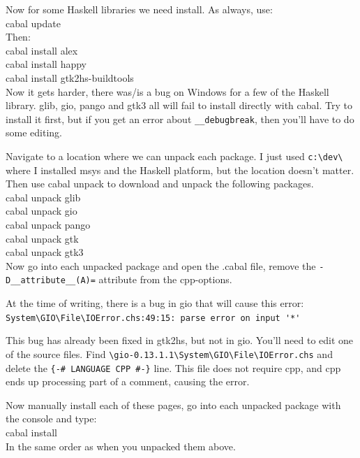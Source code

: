 \documentclass[10point]{article}
\begin{document}
\noindent Now for some Haskell libraries we need install. As always, use:\\
cabal update\\

\noindent Then:\\
cabal install alex\\
cabal install happy\\
cabal install gtk2hs-buildtools\\

\noindent Now it gets harder, there was/is a bug on Windows for a few of the Haskell library. glib, gio, pango and gtk3 all will fail to install directly with cabal. Try to install it first, but if you get an error about \verb"__debugbreak", then you'll have to do some editing.

Navigate to a location where we can unpack each package. I just used \verb"c:\dev\" where I installed msys and the Haskell platform, but the location doesn't matter. Then use cabal unpack to download and unpack the following packages.\\

\noindent cabal unpack glib\\
cabal unpack gio\\
cabal unpack pango\\
cabal unpack gtk\\
cabal unpack gtk3\\

\noindent Now go into each unpacked package and open the .cabal file, remove the \verb"-D__attribute__(A)=" attribute from the cpp-options.
\\ \linebreak

\noindent At the time of writing, there is a bug in gio that will cause this error: \\
\verb"System\GIO\File\IOError.chs:49:15: parse error on input '*'"
\linebreak

\noindent This bug has already been fixed in gtk2hs, but not in gio. You'll need to edit one of the source files. Find \verb"\gio-0.13.1.1\System\GIO\File\IOError.chs" and delete the \verb"{-# LANGUAGE CPP #-}" line. This file does not require cpp, and cpp ends up processing part of a comment, causing the error.
\\ \linebreak

\noindent Now manually install each of these pages, go into each unpacked package with the console and type: \\
cabal install \\
In the same order as when you unpacked them above.
\\ \linebreak
\end{document}
